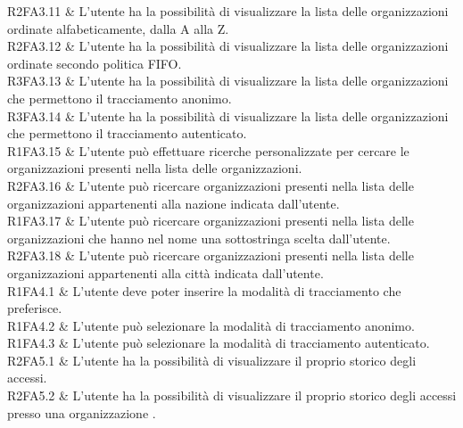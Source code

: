 R2FA3.11 & L’utente ha la possibilità di visualizzare la lista delle organizzazioni ordinate alfabeticamente, dalla A alla Z. \\

R2FA3.12 & L’utente ha la possibilità di visualizzare la lista delle organizzazioni ordinate secondo politica FIFO. \\

R3FA3.13 & L’utente ha la possibilità di visualizzare la lista delle organizzazioni che permettono il tracciamento anonimo.\\

R3FA3.14 & L’utente ha la possibilità di visualizzare la lista delle organizzazioni che permettono il tracciamento autenticato. \\

R1FA3.15 & L’utente può effettuare ricerche personalizzate per cercare le organizzazioni presenti nella lista delle organizzazioni. \\

R2FA3.16 & L’utente può ricercare organizzazioni presenti nella lista delle organizzazioni appartenenti alla nazione indicata dall’utente.\\

R1FA3.17 & L’utente può ricercare organizzazioni presenti nella lista delle organizzazioni che hanno nel nome una sottostringa scelta dall'utente. \\

R2FA3.18 & L’utente può ricercare organizzazioni presenti nella lista delle organizzazioni appartenenti alla città indicata dall’utente. \\

R1FA4.1 & L’utente deve poter inserire la modalità di tracciamento che preferisce.\\

R1FA4.2 & L’utente può selezionare la modalità di tracciamento anonimo.\\

R1FA4.3 & L’utente può selezionare la modalità di tracciamento autenticato.\\

R2FA5.1 & L’utente ha la possibilità di visualizzare il proprio storico degli accessi. \\

R2FA5.2 & L’utente ha la possibilità di visualizzare il proprio storico degli accessi presso una organizzazione . \\

